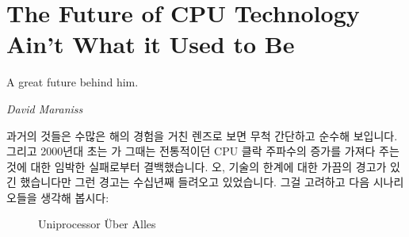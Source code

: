 
\section{The Future of CPU Technology Ain't What it Used to Be}
\label{sec:future:The Future of CPU Technology Ain't What it Used to Be}
%
\epigraph{A great future behind him.}{\emph{David Maraniss}}

과거의 것들은 수많은 해의 경험을 거친 렌즈로 보면 무척 간단하고 순수해
보입니다.
그리고 2000년대 초는  가 그때는 전통적이던 CPU 클락 주파수의
증가를 가져다 주는 것에 대한 임박한 실패로부터 결백했습니다.
오, 기술의 한계에 대한 가끔의 경고가 있긴 했습니다만 그런 경고는 수십년째
들려오고 있었습니다.
그걸 고려하고 다음 시나리오들을 생각해 봅시다:

\begin{figure}[tb]
\centering
{}
\caption{Uniprocessor \"Uber Alles}
\end{figure}

